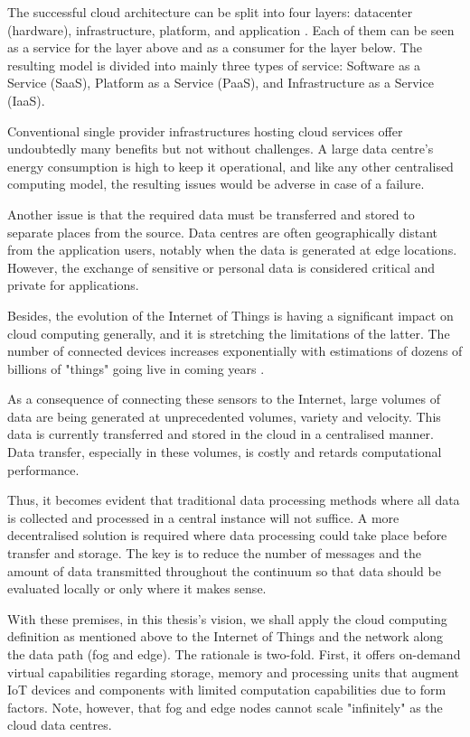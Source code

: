 \documentclass{ieeeaccess}
\begin{document}
The successful cloud architecture can be split into four layers: datacenter (hardware), infrastructure, platform, and application \cite{cloud-computing}. Each of them can be seen as a service for the layer above and as a consumer for the layer below. The resulting model is divided into mainly three types of service: Software as a Service (SaaS), Platform as a Service (PaaS), and Infrastructure as a Service (IaaS).

Conventional single provider infrastructures hosting cloud services offer undoubtedly many benefits but not without challenges. A large data centre’s energy consumption is high to keep it operational, and like any other centralised computing model, the resulting issues would be adverse in case of a failure.

Another issue is that the required data must be transferred and stored to separate places from the source. Data centres are often geographically distant from the application users, notably when the data is generated at edge locations. However, the exchange of sensitive or personal data is considered critical and private for applications.

Besides, the evolution of the Internet of Things is having a significant impact on cloud computing generally, and it is stretching the limitations of the latter. The number of connected devices increases exponentially with estimations of dozens of billions of "things" going live in coming years \cite{gartner-iot}.

As a consequence of connecting these sensors to the Internet, large volumes of data are being generated at unprecedented volumes, variety and velocity. This data is currently transferred and stored in the cloud in a centralised manner. Data transfer, especially in these volumes, is costly and retards computational performance.

Thus, it becomes evident that traditional data processing methods where all data is collected and processed in a central instance will not suffice. A more decentralised solution is required where data processing could take place before transfer and storage. The key is to reduce the number of messages and the amount of data transmitted throughout the continuum so that data should be evaluated locally or only where it makes sense.

With these premises, in this thesis's vision, we shall apply the cloud computing definition as mentioned above to the Internet of Things and the network along the data path (fog and edge). The rationale is two-fold. First, it offers on-demand virtual capabilities regarding storage, memory and processing units that augment IoT devices and components with limited computation capabilities due to form factors. Note, however, that fog and edge nodes cannot scale "infinitely" as the cloud data centres.
\end{document}
